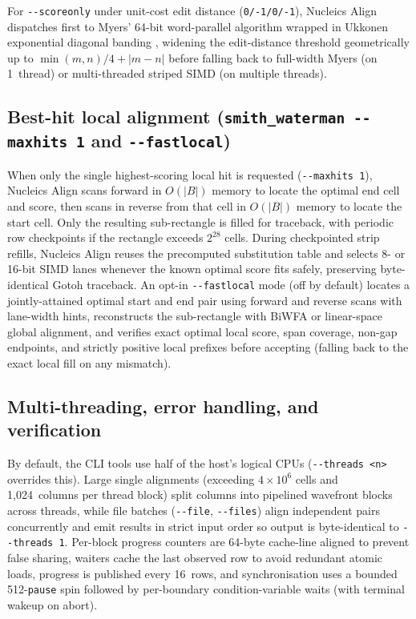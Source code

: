 \documentclass[11pt,a4paper]{article}
\begin{document}
For \texttt{-{}-scoreonly} under unit-cost edit distance (\texttt{0/-1/0/-1}), Nucleics Align dispatches first to Myers' 64-bit word-parallel algorithm \citep{myers1999fast} wrapped in Ukkonen exponential diagonal banding \citep{ukkonen1985algorithms}, widening the edit-distance threshold geometrically up to $\min(m, n)/4 + |m - n|$ before falling back to full-width Myers (on 1~thread) or multi-threaded striped SIMD (on multiple threads).

\subsection{Best-hit local alignment (\texttt{smith\_waterman -{}-maxhits 1} and \texttt{-{}-fastlocal})}

When only the single highest-scoring local hit is requested (\texttt{-{}-maxhits 1}), Nucleics Align scans forward in $O(|B|)$ memory to locate the optimal end cell and score, then scans in reverse from that cell in $O(|B|)$ memory to locate the start cell. Only the resulting sub-rectangle is filled for traceback, with periodic row checkpoints if the rectangle exceeds $2^{28}$ cells. During checkpointed strip refills, Nucleics Align reuses the precomputed substitution table and selects 8- or 16-bit SIMD lanes whenever the known optimal score fits safely, preserving byte-identical Gotoh traceback. An opt-in \texttt{-{}-fastlocal} mode (off by default) locates a jointly-attained optimal start and end pair using forward and reverse scans with lane-width hints, reconstructs the sub-rectangle with BiWFA or linear-space global alignment, and verifies exact optimal local score, span coverage, non-gap endpoints, and strictly positive local prefixes before accepting (falling back to the exact local fill on any mismatch).

\subsection{Multi-threading, error handling, and verification}

By default, the CLI tools use half of the host's logical CPUs (\texttt{-{}-threads <n>} overrides this). Large single alignments (exceeding $4 \times 10^6$ cells and 1,024~columns per thread block) split columns into pipelined wavefront blocks across threads, while file batches (\texttt{-{}-file}, \texttt{-{}-files}) align independent pairs concurrently and emit results in strict input order so output is byte-identical to \texttt{-{}-threads 1}. Per-block progress counters are 64-byte cache-line aligned to prevent false sharing, waiters cache the last observed row to avoid redundant atomic loads, progress is published every 16~rows, and synchronisation uses a bounded 512-\texttt{pause} spin followed by per-boundary condition-variable waits (with terminal wakeup on abort).
\end{document}
